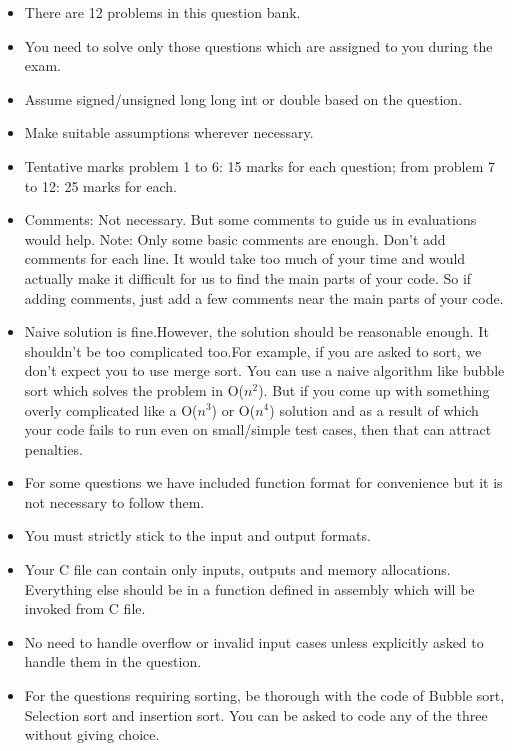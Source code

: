 \documentclass[a4paper,11pt]{article} %
\begin{document}
\begin{itemize}
    \item There are 12 problems in this question bank.
    \item You need to solve only those questions which are assigned to you during the exam.
    \item Assume  signed/unsigned long long int or double based on the question.
    \item Make suitable assumptions wherever necessary.
    \item Tentative marks problem 1 to 6: 15 marks for each question; from problem 7 to 12: 25 marks for each.
    \item Comments: Not necessary. But some comments to guide us in evaluations would help. Note: Only some basic comments are enough. Don’t add comments for each line. It would take too much of your time and would actually make it difficult for us to find the main parts of your code. So if adding comments, just add a few comments near the main parts of your code.
    \item Naive solution is fine.However, the solution should be reasonable enough. It shouldn't be too complicated too.For example, if you are asked to sort, we don't expect you to use merge sort. You can use a naive algorithm like bubble sort which solves the problem in O($n^2$). But if you come up with something overly complicated like a O($n^{3}$) or O($n^4$) solution and as a result of which your code fails to run even on small/simple test cases, then that can attract penalties.
    \item For some questions we have included function format for convenience but it is not necessary to follow them.
    \item You must strictly stick to the input and output formats.
    \item  Your C file can contain only inputs, outputs and memory allocations. Everything else should be in a function defined in assembly which will be invoked from C file.
    \item No need to handle overflow or invalid input cases unless explicitly asked to handle them in the question.
    \item For the questions requiring sorting, be thorough with the code of Bubble sort, Selection sort and insertion sort. You can be asked to code any of the three without giving choice.



\end{itemize}
\end{document}
